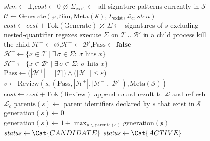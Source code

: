 \begin{figure}[tp!]
\begin{algorithm}[t]
\begin{algorithmic}[1]
\State $\mathit{shm} \gets \bot$,\quad $\mathit{cost} \gets 0$
    \State \Return $\varnothing$
  \EndIf
  \State $\Sigma_{\mathrm{exist}} \gets$ all signature patterns currently in $\mathcal{S}$
  \State $\mathcal{C} \gets \mathrm{Generate}(\varphi, \mathrm{Sim}, \mathrm{Meta}(\mathcal{S}), \Sigma_{\mathrm{exist}}, \mathcal{L}_{c}, \mathit{shm})$
  \State $\mathit{cost} \gets \mathit{cost} + \mathrm{Tok}(\mathrm{Generate})$
    \State \Return $\varnothing$
  \EndIf
    \State $\Sigma \gets$ signatures of $s$ excluding nested-quantifier regexes
    \State execute $\Sigma$ on $\mathcal{T} \cup \mathcal{B}'$ in a child process
      \State kill the child
      \State $\mathcal{H}^{+} \gets \varnothing$,\quad $\mathcal{H}^{-} \gets \mathcal{B}'$,\quad $\mathrm{Pass} \gets \mathbf{false}$
    \Else
      \State $\mathcal{H}^{+} \gets \{ x \in \mathcal{T} \mid \exists\, \sigma \in \Sigma:\ \sigma \text{ hits } x \}$
      \State $\mathcal{H}^{-} \gets \{ x \in \mathcal{B}' \mid \exists\, \sigma \in \Sigma:\ \sigma \text{ hits } x \}$
      \State $\mathrm{Pass} \gets \bigl(|\mathcal{H}^{+}|=|\mathcal{T}|\bigr) \land \bigl(|\mathcal{H}^{-}|\le \varepsilon\bigr)$
    \EndIf
    \State $v \gets \mathrm{Review}(s, (\mathrm{Pass}, |\mathcal{H}^{+}|, |\mathcal{H}^{-}|, |\mathcal{B}'|), \mathrm{Meta}(\mathcal{S}))$
    \State $\mathit{cost} \gets \mathit{cost} + \mathrm{Tok}(\mathrm{Review})$
    \State append round result to $\mathcal{L}$ and refresh $\mathcal{L}_{c}$
      \State $\mathrm{parents}(s) \gets$ parent identifiers declared by $s$ that exist in $\mathcal{S}$
        \State $\mathrm{generation}(s) \gets 0$
      \Else
        \State $\mathrm{generation}(s) \gets 1+\max_{p\in\mathrm{parents}(s)}\mathrm{generation}(p)$
      \EndIf
      \State $\mathit{status} \gets \Cat{CANDIDATE}$
        \State $\mathit{status} \gets \Cat{ACTIVE}$
      \EndIf

\end{algorithmic}
\end{algorithm}
\end{figure}
